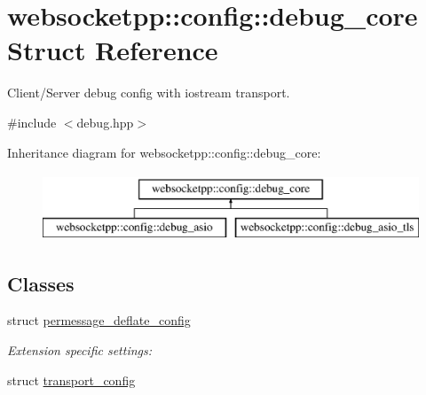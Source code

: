 \hypertarget{structwebsocketpp_1_1config_1_1debug__core}{}\section{websocketpp\+:\+:config\+:\+:debug\+\_\+core Struct Reference}
\label{structwebsocketpp_1_1config_1_1debug__core}


Client/\+Server debug config with iostream transport.  




{\ttfamily \#include $<$debug.\+hpp$>$}

Inheritance diagram for websocketpp\+:\+:config\+:\+:debug\+\_\+core\+:\begin{figure}[H]
\begin{center}
\leavevmode
\includegraphics[height=2.000000cm]{structwebsocketpp_1_1config_1_1debug__core}
\end{center}
\end{figure}
\subsection*{Classes}
\begin{DoxyCompactItemize}
\item 
struct \hyperlink{structwebsocketpp_1_1config_1_1debug__core_1_1permessage__deflate__config}{permessage\+\_\+deflate\+\_\+config}
\begin{DoxyCompactList}\small\item\em Extension specific settings\+: \end{DoxyCompactList}\item 
struct \hyperlink{structwebsocketpp_1_1config_1_1debug__core_1_1transport__config}{transport\+\_\+config}
\end{DoxyCompactItemize}
